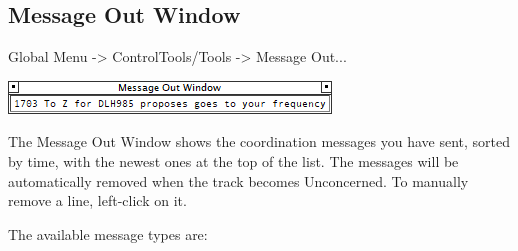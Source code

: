 \documentclass[11pt,a4paper]{memoir}
\begin{document}
\subsection{Message Out Window}
\label{win:mow}

Global Menu -> ControlTools/Tools -> Message Out...

\includegraphics{img/mow.png}

The Message Out Window shows the coordination messages you have sent, sorted by time, with the newest ones at the top of the list. The messages will be automatically removed when the track becomes Unconcerned. To manually remove a line, left-click on it.

The available message types are:
\end{document}

